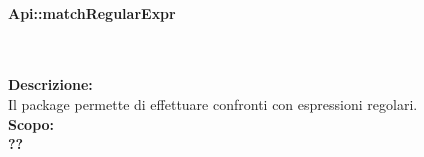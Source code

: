 \begin{samepage}
\paragraph{Api::matchRegularExpr}\label{api-regexpr}\mbox{}\\
\end{samepage}
\textbf{Descrizione:}\\ 
Il package permette di effettuare confronti con espressioni regolari.\\ 
\textbf{Scopo:}\\
\textbf{??}